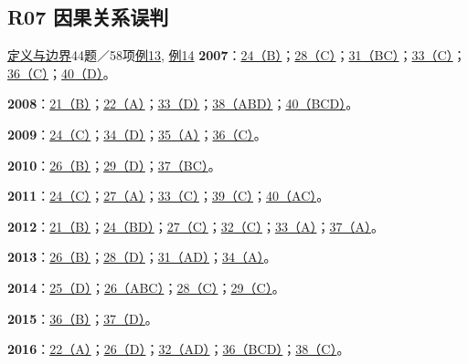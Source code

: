 \documentclass[11pt,a4paper]{article}
\begin{document}
\subsection{R07 因果关系误判}\label{class-R07}
\noindent \hyperref[cat-R07]{定义与边界}\quad 44题／58项\quad \hyperref[case-2008-T4-Q38]{例13}, \hyperref[case-2011-T1-Q24]{例14}
\noindent\textbf{2007}：\hyperref[idx-2007-T1-Q24]{24（B）}；\hyperref[idx-2007-T2-Q28]{28（C）}；\hyperref[idx-2007-T3-Q31]{31（BC）}；\hyperref[idx-2007-T3-Q33]{33（C）}；\hyperref[idx-2007-T4-Q36]{36（C）}；\hyperref[idx-2007-T4-Q40]{40（D）}。\par
\noindent\textbf{2008}：\hyperref[idx-2008-T1-Q21]{21（B）}；\hyperref[idx-2008-T1-Q22]{22（A）}；\hyperref[idx-2008-T3-Q33]{33（D）}；\hyperref[idx-2008-T4-Q38]{38（ABD）}；\hyperref[idx-2008-T4-Q40]{40（BCD）}。\par
\noindent\textbf{2009}：\hyperref[idx-2009-T1-Q24]{24（C）}；\hyperref[idx-2009-T3-Q34]{34（D）}；\hyperref[idx-2009-T3-Q35]{35（A）}；\hyperref[idx-2009-T4-Q36]{36（C）}。\par
\noindent\textbf{2010}：\hyperref[idx-2010-T2-Q26]{26（B）}；\hyperref[idx-2010-T2-Q29]{29（D）}；\hyperref[idx-2010-T4-Q37]{37（BC）}。\par
\noindent\textbf{2011}：\hyperref[idx-2011-T1-Q24]{24（C）}；\hyperref[idx-2011-T2-Q27]{27（A）}；\hyperref[idx-2011-T3-Q33]{33（C）}；\hyperref[idx-2011-T4-Q39]{39（C）}；\hyperref[idx-2011-T4-Q40]{40（AC）}。\par
\noindent\textbf{2012}：\hyperref[idx-2012-T1-Q21]{21（B）}；\hyperref[idx-2012-T1-Q24]{24（BD）}；\hyperref[idx-2012-T2-Q27]{27（C）}；\hyperref[idx-2012-T3-Q32]{32（C）}；\hyperref[idx-2012-T3-Q33]{33（A）}；\hyperref[idx-2012-T4-Q37]{37（A）}。\par
\noindent\textbf{2013}：\hyperref[idx-2013-T2-Q26]{26（B）}；\hyperref[idx-2013-T2-Q28]{28（D）}；\hyperref[idx-2013-T3-Q31]{31（AD）}；\hyperref[idx-2013-T3-Q34]{34（A）}。\par
\noindent\textbf{2014}：\hyperref[idx-2014-T1-Q25]{25（D）}；\hyperref[idx-2014-T2-Q26]{26（ABC）}；\hyperref[idx-2014-T2-Q28]{28（C）}；\hyperref[idx-2014-T2-Q29]{29（C）}。\par
\noindent\textbf{2015}：\hyperref[idx-2015-T4-Q36]{36（B）}；\hyperref[idx-2015-T4-Q37]{37（D）}。\par
\noindent\textbf{2016}：\hyperref[idx-2016-T1-Q22]{22（A）}；\hyperref[idx-2016-T2-Q26]{26（D）}；\hyperref[idx-2016-T3-Q32]{32（AD）}；\hyperref[idx-2016-T4-Q36]{36（BCD）}；\hyperref[idx-2016-T4-Q38]{38（C）}。\par
{}
\end{document}
